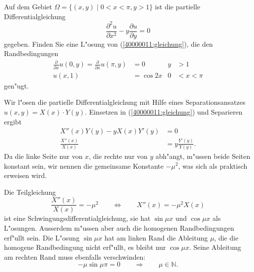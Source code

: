 Auf dem Gebiet $\Omega=\{(x,y)\;|\;0<x<\pi,y>1\}$
ist die partielle Differentialgleichung
\begin{equation}
\frac{\partial^2 u}{\partial x^2}-y\frac{\partial u}{\partial y}=0
\label{40000011:gleichung}
\end{equation}
gegeben. Finden Sie eine L"osung von (\ref{40000011:gleichung}), die den
Randbedingungen
\begin{align*}
\frac{\partial}{\partial x}u(0,y)=
\frac{\partial}{\partial x}u(\pi,y)&=0&y&> 1\\
u(x,1)&=\cos2x&0&<x<\pi
\end{align*}
gen"ugt.

\begin{loesung}
Wir l"osen die partielle Differentialgleichung mit Hilfe eines 
Separationsansatzes $u(x,y)=X(x)\cdot Y(y)$.
Einsetzen in (\ref{40000011:gleichung}) und Separieren ergibt
\begin{align*}
X''(x)Y(y)-yX(x)Y'(y)&=0\\
\frac{X''(x)}{X(x)}&=y\frac{Y'(y)}{Y(y)}.
\end{align*}
Da die linke Seite nur von $x$, die rechte nur von $y$ abh"angt, m"ussen
beide Seiten konstant sein, wir nennen die gemeinsame Konstante $-\mu^2$,
was sich als praktisch erweisen wird.

Die Teilgleichung
\[
\frac{X''(x)}{X(x)}=-\mu^2
\qquad
\Leftrightarrow
\qquad
X''(x)=-\mu^2X(x)
\]
ist eine Schwingungsdifferentialgleichung, sie hat $\sin\mu x$ und $\cos\mu x$
als L"osungen. Ausserdem m"ussen aber auch die homogenen Randbedingungen
erf"ullt sein. Die L"osung $\sin\mu x$ hat am linken Rand die Ableitung $\mu$,
die die homogene Randbedingung nicht erf"ullt, es bleibt nur $\cos\mu x$.
Seine Ableitung am rechten Rand muss ebenfalls verschwinden:
\[
-\mu\sin\mu \pi=0
\qquad
\Rightarrow
\qquad
\mu\in\mathbb N.
\]


\end{loesung}

